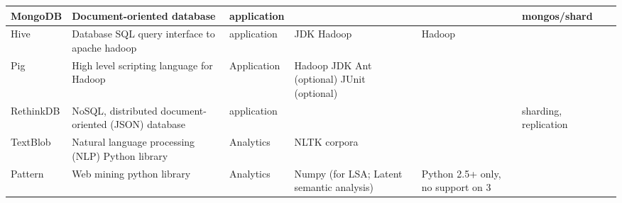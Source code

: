 \documentclass[9pt,twocolumn,twoside]{styles/osajnl}
\begin{document}
\begin{table}[p]
\begin{center}
\begin{small}
\begin{tabular}{l|m{3cm}|l|m{2cm}|m{2cm}|m{2cm}|m{2cm}}
	MongoDB & Document-oriented database & application & & & mongos/shard & \\ \hline
	Hive & Database SQL query interface to apache hadoop & application & JDK  Hadoop & 	Hadoop &  &  \\ \hline
	Pig & High level scripting language for Hadoop & Application & 	Hadoop JDK Ant (optional) JUnit (optional) &  & & \\ \hline
	RethinkDB & NoSQL, distributed document-oriented (JSON) database & application &  & & sharding, replication & \\ \hline
	TextBlob & Natural language processing (NLP) Python library & 	Analytics & 	NLTK corpora & & & \\ \hline
	Pattern & Web mining python library & 	Analytics & 	Numpy (for LSA; Latent semantic analysis) & 	Python 2.5+ only, no support on 3 &  & \\ \hline

      \end{tabular}
    \end{small}
  \end{center}
\end{table}






 
\end{document}
